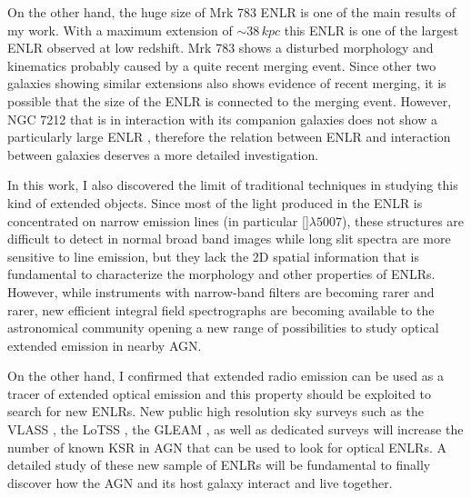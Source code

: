 \documentclass[../main.tex]{subfiles}
\begin{document}
On the other hand, the huge size of Mrk 783 ENLR is one of the main results of my work.
With a maximum extension of $\sim 38\,\si{kpc}$ this ENLR is one of the largest ENLR observed at low redshift.
Mrk 783 shows a disturbed morphology and kinematics probably caused by a quite recent merging event.
Since other two galaxies showing similar extensions \citep[UGC 7342 and NGC 5972][]{Keel12} also shows evidence of recent merging, it is possible that the size of the ENLR is connected to the merging event.
However, NGC 7212 that is in interaction with its companion galaxies does not show a particularly large ENLR \citep{Cracco11}, therefore the relation between ENLR and interaction between galaxies deserves a more detailed investigation.

In this work, I also discovered the limit of traditional techniques in studying this kind of extended objects.
Since most of the light produced in the ENLR is concentrated on narrow emission lines (in particular []$\lambda5007$), these structures are difficult to detect in normal broad band images \citep[e.g.][]{Sun18} while long slit spectra are more sensitive to line emission, but they lack the 2D spatial information that is fundamental to characterize the morphology and other properties of ENLRs.
However, while instruments with narrow-band filters are becoming rarer and rarer, new efficient integral field spectrographs are becoming available to the astronomical community opening a new range of possibilities to study optical extended emission in nearby AGN.

On the other hand, I confirmed that extended radio emission can be used as a tracer of extended optical emission and this property should be exploited to search for new ENLRs.
New public high resolution sky surveys such as the VLASS \citep[VLA Sky Survey][]{Hales13}, the LoTSS \citep[LOFAR two meter sky survey][]{Shimwell17}, the GLEAM \citep[GaLactic and Extragalactic All-sky MWA Survey][]{Hurley17}, as well as dedicated surveys will increase the number of known KSR in AGN that can be used to look for optical ENLRs.
A detailed study of these new sample of ENLRs will be fundamental to finally discover how the AGN and its host galaxy interact and live together.
\end{document}

